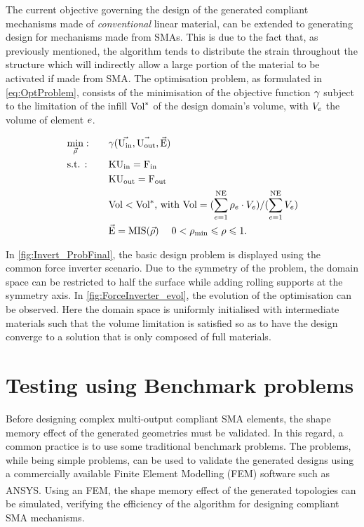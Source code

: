 The current objective governing the design of the generated compliant mechanisms made of \textit{conventional} linear material, can be extended to generating design for mechanisms made from SMAs. This is due to the fact that, as previously mentioned, the algorithm tends to distribute the strain throughout the structure which will indirectly allow a large portion of the material to be activated if made from SMA. The optimisation problem, as formulated in \cref{eq:OptProblem}, consists of the minimisation of the objective function $\gamma$ subject to the limitation of the infill $\text{Vol}^{\ast}$ of the design domain's volume, with $V_e$ the volume of element $e$.

\begin{alignat}{2} %
  \label{eq:OptProblem}
  &\underset{\vec{\ArtDen}}{\text{min}} : \quad        &&\ObjFct(\vec{\Disp_\text{in}},\vec{\Disp_\text{out}},\vec{\YoungModulus}) \notag \\
  &\text{s.t. :}            &&  \StiffMat \Disp_\text{in} = \Load_\text{in}         \notag       \\
  &                         &&  \StiffMat \Disp_\text{out} = \Load_\text{out}                \\
  &                         && \Volume < \Volume^{\ast} \text{,   with } \Volume = (\sum_{\elem=1}^{\NDesElem} \ArtDen_\elem \cdot \VolumeElem_\elem) / (\sum_{\elem=1}^{\NDesElem} \VolumeElem_\elem)   \notag      \\
  &                         && \vec{\YoungModulus} = \MIS(\vec{\ArtDen})    \quad \;     0<\ArtDen_\text{min}    \leqslant \ArtDen    \leqslant 1.     \notag
\end{alignat}

In \cref{fig:Invert_ProbFinal}, the basic design problem is displayed using the common force inverter scenario. Due to the symmetry of the problem, the domain space can be restricted to half the surface while adding rolling supports at the symmetry axis. In \cref{fig:ForceInverter_evol}, the evolution of the optimisation can be observed. Here the domain space is uniformly initialised with intermediate materials such that the volume limitation is satisfied so as to have the design converge to a solution that is only composed of full materials.

\section{Testing using Benchmark problems}\label{sec:benchmark-problems}
Before designing complex multi-output compliant SMA elements, the shape memory effect of the generated geometries must be validated. In this regard, a common practice is to use some traditional benchmark problems. The problems, while being simple problems, can be used to validate the generated designs using a commercially available Finite Element Modelling (FEM) software such as ANSYS\textsuperscript{\textregistered}. Using an FEM, the shape memory effect of the generated topologies can be simulated, verifying the efficiency of the algorithm for designing compliant SMA mechanisms.

